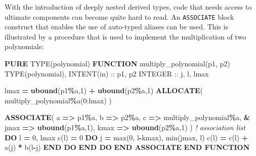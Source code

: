 \documentclass[
  paper=a4,
  ,captions=tableheading
]{scrartcl}
\newenvironment{Shaded}{\begin{snugshade}}{\end{snugshade}}
\newcommand{\BuiltInTok}[1]{#1}
\newcommand{\CommentTok}[1]{\textcolor[rgb]{0.56,0.35,0.01}{\textit{#1}}}
\newcommand{\DataTypeTok}[1]{\textcolor[rgb]{0.13,0.29,0.53}{#1}}
\newcommand{\DecValTok}[1]{\textcolor[rgb]{0.00,0.00,0.81}{#1}}
\newcommand{\FunctionTok}[1]{\textcolor[rgb]{0.13,0.29,0.53}{\textbf{#1}}}
\newcommand{\KeywordTok}[1]{\textcolor[rgb]{0.13,0.29,0.53}{\textbf{#1}}}
\newcommand{\NormalTok}[1]{#1}
\newcommand{\OperatorTok}[1]{\textcolor[rgb]{0.81,0.36,0.00}{\textbf{#1}}}
\begin{document}
With the introduction of deeply nested derived types, code that needs
access to ultimate components can become quite hard to read. An
\texttt{ASSOCIATE} block construct that enables the use of auto-typed
aliases can be used. This is illustrated by a procedure that is used to
implement the multiplication of two polynomials:

\begin{Shaded}
\begin{Highlighting}[]
\KeywordTok{PURE} \DataTypeTok{TYPE(polynomial)} \KeywordTok{FUNCTION}\NormalTok{ multiply\_polynomial(p1, p2)}
   \DataTypeTok{TYPE(polynomial)}\NormalTok{, }\DataTypeTok{INTENT(in)} \DataTypeTok{::}\NormalTok{ p1, p2}
   \DataTypeTok{INTEGER} \DataTypeTok{::}\NormalTok{ j, l, lmax}

\NormalTok{   lmax }\KeywordTok{=} \FunctionTok{ubound}\NormalTok{(p1}\OperatorTok{\%}\NormalTok{a,}\DecValTok{1}\NormalTok{) }\KeywordTok{+} \FunctionTok{ubound}\NormalTok{(p2}\OperatorTok{\%}\NormalTok{a,}\DecValTok{1}\NormalTok{)}
   \KeywordTok{ALLOCATE}\NormalTok{( multiply\_polynomial}\OperatorTok{\%}\NormalTok{a(}\DecValTok{0}\NormalTok{:lmax) )}

   \KeywordTok{ASSOCIATE}\NormalTok{( a }\KeywordTok{=}\OperatorTok{\textgreater{}}\NormalTok{ p1}\OperatorTok{\%}\NormalTok{a, b }\KeywordTok{=}\OperatorTok{\textgreater{}}\NormalTok{ p2}\OperatorTok{\%}\NormalTok{a, c }\KeywordTok{=}\OperatorTok{\textgreater{}}\NormalTok{ multiply\_polynomial}\OperatorTok{\%}\NormalTok{a, }\KeywordTok{\&}
\NormalTok{              jmax }\KeywordTok{=}\OperatorTok{\textgreater{}} \FunctionTok{ubound}\NormalTok{(p1}\OperatorTok{\%}\NormalTok{a,}\DecValTok{1}\NormalTok{), kmax }\KeywordTok{=}\OperatorTok{\textgreater{}} \FunctionTok{ubound}\NormalTok{(p2}\OperatorTok{\%}\NormalTok{a,}\DecValTok{1}\NormalTok{) )  }\CommentTok{! association list}
      \KeywordTok{DO}\NormalTok{ l }\KeywordTok{=} \DecValTok{0}\NormalTok{, lmax}
\NormalTok{         c(l) }\KeywordTok{=} \DecValTok{0}
         \KeywordTok{DO}\NormalTok{ j }\KeywordTok{=} \BuiltInTok{max}\NormalTok{(}\DecValTok{0}\NormalTok{, l}\KeywordTok{{-}}\NormalTok{kmax), }\BuiltInTok{min}\NormalTok{(jmax, l)}
\NormalTok{            c(l) }\KeywordTok{=}\NormalTok{ c(l) }\KeywordTok{+}\NormalTok{ a(j) }\KeywordTok{*}\NormalTok{ b(l}\KeywordTok{{-}}\NormalTok{j)}
         \KeywordTok{END DO}
      \KeywordTok{END DO}
   \KeywordTok{END ASSOCIATE}
\KeywordTok{END FUNCTION}
\end{Highlighting}
\end{Shaded}
\end{document}
